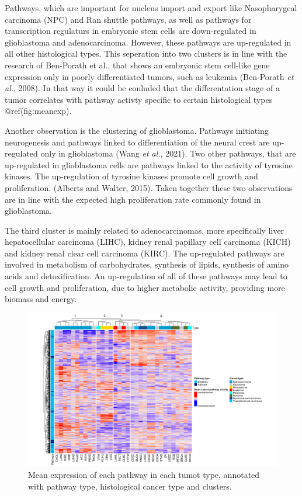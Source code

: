 \documentclass[
  parskip,
  oneside]{scrreprt}
\begin{document}
Pathways, which are important for nucleus import and export like
Nasopharygeal carcinoma (NPC) and Ran shuttle pathways, as well as
pathways for transcription regulaturs in embryonic stem cells are
down-regulated in glioblastoma and adenocarcinoma. However, these
pathways are up-regulated in all other histological types. This
seperation into two clusters is in line with the research of Ben-Porath
et al., that shows an embryonic stem cell-like gene expression only in
poorly differentiated tumors, such as leukemia (Ben-Porath \emph{et
al.}, 2008). In that way it could be conluded that the differentation
stage of a tumor correlates with pathway activty specific to certain
histological types @ref(fig:meanexp).

Another observation is the clustering of glioblastoma. Pathways
initiating neurogenesis and pathways linked to differentiation of the
neural crest are up-regulated only in glioblastoma (Wang \emph{et al.},
2021). Two other pathways, that are up-regulated in glioblastoma cells
are pathways linked to the activity of tyrosine kinases. The
up-regulation of tyrosine kinases promote cell growth and proliferation.
(Alberts and Walter, 2015). Taken together these two observations are in
line with the expected high proliferation rate commonly found in
glioblastoma.

The third cluster is mainly related to adenocarcinomas, more
specifically liver hepatocellular carcinoma (LIHC), kidney renal
papillary cell carcinoma (KICH) and kidney renal clear cell carcinoma
(KIRC). The up-regulated pathways are involved in metabolism of
carbohydrates, synthesis of lipids, synthesis of amino acids and
detoxification. An up-regulation of all of these pathways may lead to
cell growth and proliferation, due to higher metabolic activity,
providing more biomass and energy.

\begin{figure}

{\centering \includegraphics[width=0.5\linewidth]{figures/Pan Cancer mean expression} 

}

\caption{Mean expression of each pathway in each tumot type, annotated with pathway type, histological cancer type and clusters.}\label{fig:meanexp}
\end{figure}
\end{document}
